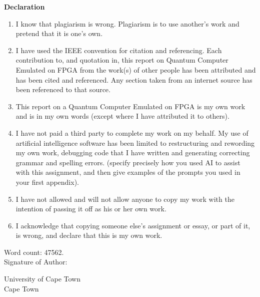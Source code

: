 {\fontsize{16}{19} \selectfont \bf {Declaration}} \\
\begin{enumerate}
	\item
	I know that plagiarism is wrong. Plagiarism is to use another’s work and pretend that it is one’s own.
	\item 
	I have used the IEEE convention for citation and referencing. Each contribution to, and quotation in, this report on Quantum Computer Emulated on FPGA from the work(s) of other people has been attributed and has been cited and referenced. Any section taken from an internet source has been referenced to that source.
	\item 
	This report on a Quantum Computer Emulated on FPGA is my own work and is in my own words (except where I have attributed it to others).
	\item 
	I have not paid a third party to complete my work on my behalf. My use of artificial intelligence software has been limited to restructuring and rewording my own work, debugging code that I have written and generating correcting grammar and spelling errors. (specify precisely how you used AI to assist with this assignment, and then give examples of the prompts you used in your first appendix).
	\item 
	I have not allowed and will not allow anyone to copy my work with the intention of passing it off as his or her own work.
	\item 
	I acknowledge that copying someone else’s assignment or essay, or part of it, is wrong, and declare that this is my own work.
\end{enumerate}
Word count: 47562.
\vspace*{1.5cm}
\\Signature of Author:
\par\noindent{}\hfill\makebox[2.0in]{\today}%
\par\noindent\makebox[2.5in]{\hrulefill} \hfill\makebox[2.0in]{\hrulefill}%
\par\noindent{}      \hfill{}%

\vspace*{0.5cm}
University of Cape Town \\
Cape Town \\
